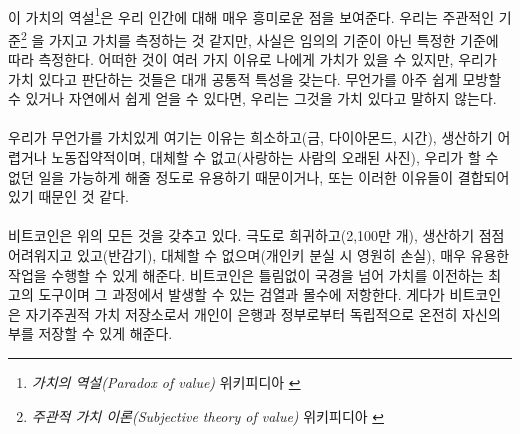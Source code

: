 \paragraph{}
이 가치의 역설\footnote{\textit{가치의 역설(Paradox of value)} 위키피디아 \cite{wiki:paradox-of-value}}은 
우리 인간에 대해 매우 흥미로운 점을 보여준다. 
우리는 주관적인 기준\footnote{\textit{주관적 가치 이론(Subjective theory of value)} 위키피디아 \cite{wiki:subjective-theory-of-value}}
을 가지고 가치를 측정하는 것 같지만, 사실은 임의의 기준이 아닌 특정한 기준에 따라 측정한다. 
어떠한 것이 여러 가지 이유로 나에게 가치가 있을 수 있지만, 우리가 가치 있다고 판단하는 것들은 대개 공통적 특성을 갖는다.
무언가를 아주 쉽게 모방할 수 있거나 자연에서 쉽게 얻을 수 있다면, 우리는 그것을 가치 있다고 말하지 않는다. 


% 
\paragraph{}
우리가 무언가를 가치있게 여기는 이유는 
희소하고(금, 다이아몬드, 시간),
생산하기 어렵거나 노동집약적이며, 대체할 수 없고(사랑하는 사람의 오래된 사진),
우리가 할 수 없던 일을 가능하게 해줄 정도로 유용하기 때문이거나, 
또는 이러한 이유들이 결합되어 있기 때문인 것 같다.


\paragraph{}
비트코인은 위의 모든 것을 갖추고 있다. 극도로 희귀하고(2,100만 개),
생산하기 점점 어려워지고 있고(반감기), 대체할 수 없으며(개인키 분실 시 영원히 손실),
매우 유용한 작업을 수행할 수 있게 해준다. 비트코인은 틀림없이 국경을 넘어 가치를 이전하는 최고의 도구이며 
그 과정에서 발생할 수 있는 검열과 몰수에 저항한다. 게다가 비트코인은 자기주권적 가치 저장소로서
개인이 은행과 정부로부터 독립적으로 온전히 자신의 부를 저장할 수 있게 해준다.

